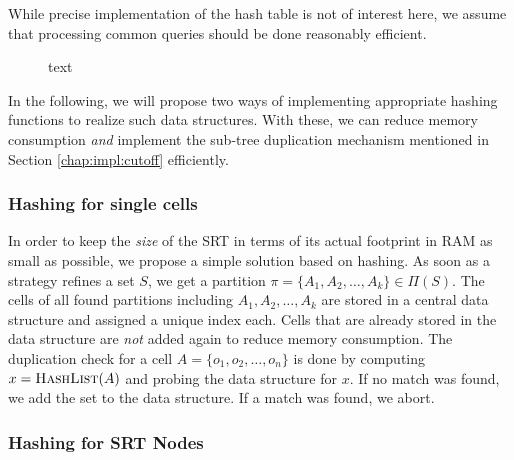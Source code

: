 		While precise implementation of the hash table is not of interest here, we assume that processing common queries should be done reasonably efficient.
		
		\begin{figure}[ht!]
			\centering
			
			\caption{text}
			\label{fig:impl:hashing:datastruct}
		\end{figure}
		
		In the following, we will propose two ways of implementing appropriate hashing functions to realize such data structures.
		With these, we can reduce memory consumption \textit{and} implement the sub-tree duplication mechanism mentioned in Section \ref{chap:impl:cutoff} efficiently.
		
		\clearpage
	
		\subsubsection{Hashing for single cells}
		
		In order to keep the \textit{size} of the \ac{SRT} in terms of its actual footprint in RAM as small as possible, we propose a simple solution based on hashing.
		As soon as a strategy refines a set $S$, we get a partition $\pi = \{ A_1, A_2, \ldots, A_k \}\in \Pi(S)$.
		The cells of all found partitions including $A_1, A_2, \ldots, A_k$ are stored in a central data structure and assigned a unique index each.
		Cells that are already stored in the data structure are \textit{not} added again to reduce memory consumption.
		The duplication check for a cell $A = \{ o_1, o_2, \ldots, o_n \}$ is done by computing $x = \Call{HashList}{A}$ and probing the data structure for $x$.
		If no match was found, we add the set to the data structure.
		If a match was found, we abort.
	
		\subsubsection{Hashing for \ac{SRT} Nodes}
	
